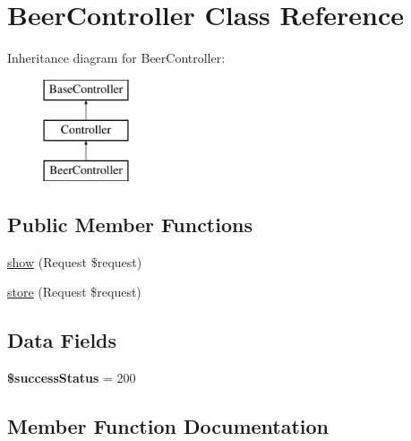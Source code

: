 \hypertarget{class_app_1_1_http_1_1_controllers_1_1_a_p_i_1_1_beer_controller}{}\section{Beer\+Controller Class Reference}
\label{class_app_1_1_http_1_1_controllers_1_1_a_p_i_1_1_beer_controller}
Inheritance diagram for Beer\+Controller\+:\begin{figure}[H]
\begin{center}
\leavevmode
\includegraphics[height=3.000000cm]{class_app_1_1_http_1_1_controllers_1_1_a_p_i_1_1_beer_controller}
\end{center}
\end{figure}
\subsection*{Public Member Functions}
\begin{DoxyCompactItemize}
\item 
\mbox{\hyperlink{class_app_1_1_http_1_1_controllers_1_1_a_p_i_1_1_beer_controller_a5ab3bd1c209b4353ac32bd7ee51985d2}{show}} (Request \$request)
\item 
\mbox{\hyperlink{class_app_1_1_http_1_1_controllers_1_1_a_p_i_1_1_beer_controller_a9ef485163104597c12185b53cdacf638}{store}} (Request \$request)
\end{DoxyCompactItemize}
\subsection*{Data Fields}
\begin{DoxyCompactItemize}
\item 
\mbox{\label{class_app_1_1_http_1_1_controllers_1_1_a_p_i_1_1_beer_controller_a4fde01aada3b602338d7002a598a8763}} 
{\bfseries \$success\+Status} = 200
\end{DoxyCompactItemize}


\subsection{Member Function Documentation}
\mbox{\label{class_app_1_1_http_1_1_controllers_1_1_a_p_i_1_1_beer_controller_a5ab3bd1c209b4353ac32bd7ee51985d2}} 
